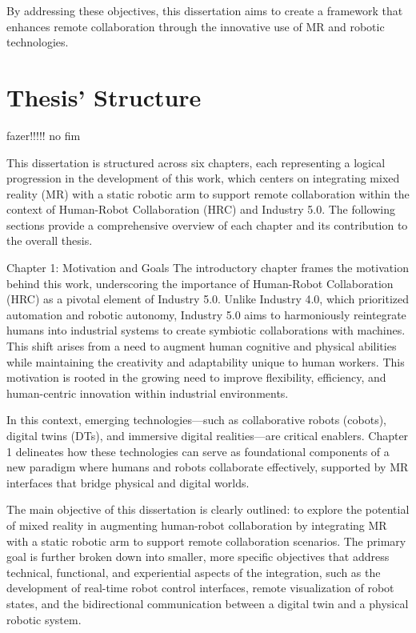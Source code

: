 By addressing these objectives, this dissertation aims to create a framework that enhances remote collaboration through the innovative use 
of \ac{MR} and robotic technologies.



\section{Thesis' Structure}
% 
fazer!!!!! no fim 

This dissertation is structured across six chapters, each representing a logical progression in the development of this work, which centers on integrating mixed reality (MR) with a static robotic arm to support remote collaboration within the context of Human-Robot Collaboration (HRC) and Industry 5.0. The following sections provide a comprehensive overview of each chapter and its contribution to the overall thesis.

Chapter 1: Motivation and Goals
The introductory chapter frames the motivation behind this work, underscoring the importance of Human-Robot Collaboration (HRC) as a pivotal element of Industry 5.0. Unlike Industry 4.0, which prioritized automation and robotic autonomy, Industry 5.0 aims to harmoniously reintegrate humans into industrial systems to create symbiotic collaborations with machines. This shift arises from a need to augment human cognitive and physical abilities while maintaining the creativity and adaptability unique to human workers. This motivation is rooted in the growing need to improve flexibility, efficiency, and human-centric innovation within industrial environments.

In this context, emerging technologies—such as collaborative robots (cobots), digital twins (DTs), and immersive digital realities—are critical enablers. Chapter 1 delineates how these technologies can serve as foundational components of a new paradigm where humans and robots collaborate effectively, supported by MR interfaces that bridge physical and digital worlds.

The main objective of this dissertation is clearly outlined: to explore the potential of mixed reality in augmenting human-robot collaboration by integrating MR with a static robotic arm to support remote collaboration scenarios. The primary goal is further broken down into smaller, more specific objectives that address technical, functional, and experiential aspects of the integration, such as the development of real-time robot control interfaces, remote visualization of robot states, and the bidirectional communication between a digital twin and a physical robotic system.

